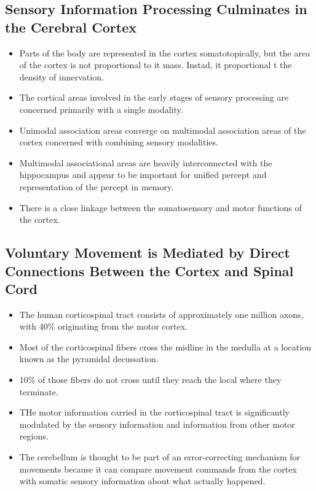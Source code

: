 \documentclass[12pt,a4paper]{article}
\begin{document}
\subsection{Sensory Information Processing Culminates in the Cerebral Cortex}
\begin{itemize}
    \item  Parts of the body are represented in the cortex somatotopically, but the area of the cortex is not proportional to it mass. Instad, it proportional t the density of innervation.
    \item The cortical areas involved in the early stages of sensory processing are concerned primarily with a single modality. 
    \item Unimodal association areas converge on multimodal association areas of the cortex concerned with combining sensory modalities.
    \item Multimodal associational areas are heavily interconnected with the hippocampus and appear to be important for unified percept and representation of the percept in memory.
    \item There is a close linkage between the somatosensory and motor functions of the cortex.
\end{itemize}

\subsection{Voluntary Movement is Mediated by Direct Connections Between the Cortex and Spinal Cord}
\begin{itemize}
    \item The human corticospinal tract consists of approximately one million axons, with 40\% originating from the motor cortex.
    \item Most of the corticospinal fibers cross the midline in the medulla at a location known as the pyramidal decussation.
    \item 10\% of those fibers do not cross until they reach the local where they terminate.
    \item THe motor information carried in the corticospinal tract is significantly modulated by the sensory information and information from other motor regions.
    \item The cerebellum is thought to be part of an error-correcting mechanism for movements because it can compare movement commands from the cortex with somatic sensory information about what actually happened.
\end{itemize}


\end{document}
